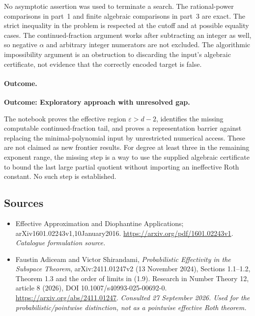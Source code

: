 \documentclass[11pt,a4paper]{article}
\newcommand{\eps}{\varepsilon}
\begin{document}
No asymptotic assertion was used to terminate a search. The rational-power
comparisons in part~1 and finite algebraic comparisons in part~3 are exact.
The strict inequality in the problem is respected at the cutoff and at
possible equality cases. The continued-fraction argument works after
subtracting an integer as well, so negative $\alpha$ and arbitrary integer
numerators are not excluded. The algorithmic impossibility argument is an
obstruction to discarding the input's algebraic certificate, not evidence
that the correctly encoded target is false.

\paragraph{Outcome.}
\textbf{Outcome: Exploratory approach with unresolved gap.}

The notebook proves the effective region $\eps>d-2$, identifies the missing
computable continued-fraction tail, and proves a representation barrier
against replacing the minimal-polynomial input by unrestricted numerical
access. These are not claimed as new frontier results. For degree at least
three in the remaining exponent range, the missing step is a way to use
the supplied algebraic certificate to bound the last large partial quotient
without importing an ineffective Roth constant. No such step is established.
\subsection{Sources}
\begin{itemize}\raggedright
\item[\textnormal{[S1]}]\hypertarget{source:statement:1}{} Effective Approximation and Diophantine Applications; arXiv1601.02243v1,10January2016.
\url{https://arxiv.org/pdf/1601.02243v1}.
{\small\textit{Catalogue formulation source.}}
\item[\textnormal{[E1]}]\hypertarget{extra:statement:1}{} Faustin Adiceam and Victor Shirandami,
\emph{Probabilistic Effectivity in the Subspace Theorem},
arXiv:2411.01247v2 (13 November 2024), Sections 1.1--1.2, Theorem 1.3
and the order of limits in (1.9). Research in Number Theory 12, article 8 (2026),
DOI 10.1007/s40993-025-00692-0.
\url{https://arxiv.org/abs/2411.01247}.
{\small\textit{Consulted 27 September 2026. Used for the probabilistic/pointwise distinction, not as a pointwise effective Roth theorem.}}
\end{itemize}
\end{document}
